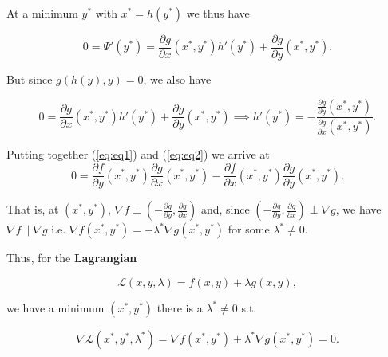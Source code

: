 \documentclass[12pt]{scrartcl}
\begin{document}
At a minimum $y^\ast$ with $x^\ast = h(y^\ast)$ we thus have

\begin{equation}
    \label{eq:eq1}
    0 = \Psi ' (y^\ast) = \frac{\partial g}{\partial x}(x^\ast, y^\ast) h'(y^\ast) + \frac{\partial g}{\partial y}(x^\ast, y^\ast).
\end{equation}

But since $g(h(y), y) = 0$, we also have

\begin{equation}
    \label{eq:eq2}
    0 = \frac{\partial g}{\partial x}(x^\ast, y^\ast) h'(y^\ast) + \frac{\partial g}{\partial y}(x^\ast, y^\ast) 
    \implies h'(y^\ast) = -\frac{\frac{\partial g}{\partial y}(x^\ast, y^\ast)}{\frac{\partial g}{\partial x}(x^\ast, y^\ast)}.
\end{equation}

Putting together (\ref{eq:eq1}) and (\ref{eq:eq2}) we arrive at
\begin{equation*}
    0 = \frac{\partial f}{\partial y}(x^\ast, y^\ast) \frac{\partial g}{\partial x}(x^\ast, y^\ast) - \frac{\partial f}{\partial x}(x^\ast, y^\ast) \frac{\partial g}{\partial y}(x^\ast, y^\ast) .
\end{equation*}

That is, at $(x^\ast, y^\ast)$, $\nabla f \perp \left( - \frac{\partial g}{\partial y}, \frac{\partial g}{\partial x}\right) $ and, since 
$\left( - \frac{\partial g}{\partial y}, \frac{\partial g}{\partial x}\right) \perp \nabla g $, we have $\nabla f \| \nabla g$ i.e.
$\nabla f(x^\ast, y^\ast) = - \lambda^\ast \nabla g(x^\ast, y^\ast)$ for some $\lambda^\ast \neq 0$.

\vspace{0.5em}

Thus, for the \textbf{Lagrangian}

\begin{equation*}
    \mathcal{L}(x, y, \lambda) = f(x, y) + \lambda g(x, y),
\end{equation*}

we have a minimum $(x^\ast, y^\ast)$ there is a $\lambda^\ast \neq 0$ s.t.

\begin{equation*}
    \nabla \mathcal{L}(x^\ast, y^\ast, \lambda^\ast) = \nabla f(x^\ast, y^\ast) + \lambda^\ast \nabla g(x^\ast, y^\ast) = 0.
\end{equation*}


\vspace{0.5em}
\end{document}
